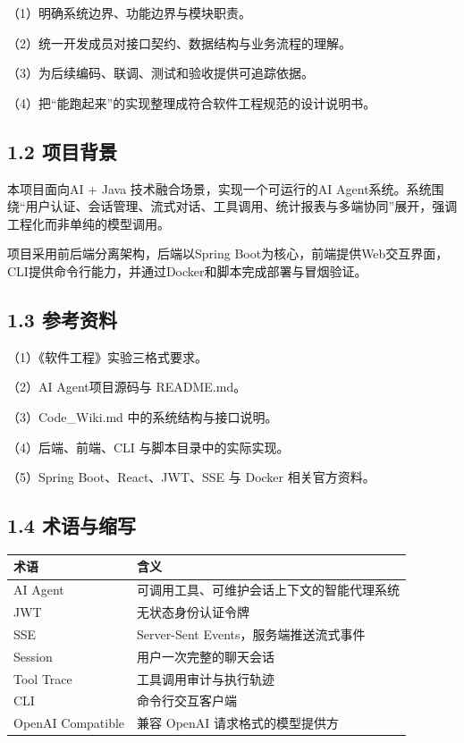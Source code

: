 \documentclass[UTF8]{ctexart}
\begin{document}
（1）明确系统边界、功能边界与模块职责。

（2）统一开发成员对接口契约、数据结构与业务流程的理解。

（3）为后续编码、联调、测试和验收提供可追踪依据。

（4）把``能跑起来''的实现整理成符合软件工程规范的设计说明书。

\subsection{\texorpdfstring{\textbf{1.2
项目背景}}{1.2 项目背景}}\label{ux9879ux76eeux80ccux666f}

本项目面向AI + Java 技术融合场景，实现一个可运行的AI
Agent系统。系统围绕``用户认证、会话管理、流式对话、工具调用、统计报表与多端协同''展开，强调工程化而非单纯的模型调用。

项目采用前后端分离架构，后端以Spring
Boot为核心，前端提供Web交互界面，CLI提供命令行能力，并通过Docker和脚本完成部署与冒烟验证。

\subsection{\texorpdfstring{\textbf{1.3
参考资料}}{1.3 参考资料}}\label{ux53c2ux8003ux8d44ux6599}

（1）《软件工程》实验三格式要求。

（2）AI Agent项目源码与 README.md。

（3）Code\_Wiki.md 中的系统结构与接口说明。

（4）后端、前端、CLI 与脚本目录中的实际实现。

（5）Spring Boot、React、JWT、SSE 与 Docker 相关官方资料。

\subsection{\texorpdfstring{\textbf{1.4
术语与缩写}}{1.4 术语与缩写}}\label{ux672fux8bedux4e0eux7f29ux5199}

\begin{longtable}[]{@{}
  >{\raggedright\arraybackslash}p{}
  >{\raggedright\arraybackslash}p{}@{}}
\toprule\noalign{}
\begin{minipage}[b]{\linewidth}\raggedright
术语
\end{minipage} & \begin{minipage}[b]{\linewidth}\raggedright
含义
\end{minipage} \\
\midrule\noalign{}
\endhead
\bottomrule\noalign{}
\endlastfoot
AI Agent & 可调用工具、可维护会话上下文的智能代理系统 \\
JWT & 无状态身份认证令牌 \\
SSE & Server-Sent Events，服务端推送流式事件 \\
Session & 用户一次完整的聊天会话 \\
Tool Trace & 工具调用审计与执行轨迹 \\
CLI & 命令行交互客户端 \\
OpenAI Compatible & 兼容 OpenAI 请求格式的模型提供方 \\
\end{longtable}
\end{document}
